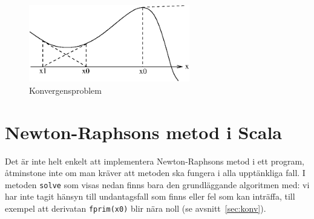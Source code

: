 \documentclass[a4paper]{article}
\begin{document}
\begin{figure}[b]
   \begin{center}
      \includegraphics[width=70mm]{konvbild}
   \end{center}
   \caption{Konvergensproblem}
   \label{konvbild}
\end{figure}



\section{Newton-Raphsons metod i Scala}

Det är inte helt enkelt att implementera Newton-Raphsons metod i ett
program, åtminstone inte om man kräver att metoden ska fungera i
alla upptänkliga fall.  I metoden \texttt{solve} som visas nedan finns bara
den grundläggande algoritmen med: vi har inte tagit hänsyn till
undantagsfall som finns eller fel som kan inträffa, till exempel
att derivatan \texttt{fprim(x0)} blir nära noll (se avsnitt~\ref{sec:konv}).

\end{document}
